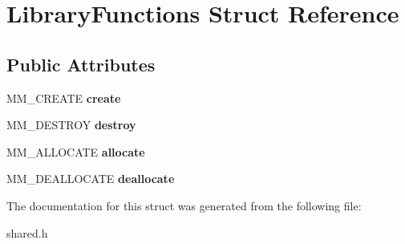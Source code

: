\hypertarget{structLibraryFunctions}{\section{Library\-Functions Struct Reference}
\label{structLibraryFunctions}
}
\subsection*{Public Attributes}
\begin{DoxyCompactItemize}
\item 
\hypertarget{structLibraryFunctions_abd81d32f0b27f2d751ef77f6cbfa3c60}{M\-M\-\_\-\-C\-R\-E\-A\-T\-E {\bfseries create}}\label{structLibraryFunctions_abd81d32f0b27f2d751ef77f6cbfa3c60}

\item 
\hypertarget{structLibraryFunctions_a6e7a32e3a3d654f6c744c8e66b564054}{M\-M\-\_\-\-D\-E\-S\-T\-R\-O\-Y {\bfseries destroy}}\label{structLibraryFunctions_a6e7a32e3a3d654f6c744c8e66b564054}

\item 
\hypertarget{structLibraryFunctions_a1dc4a3d17d034e03a4c3f0355fce3eaa}{M\-M\-\_\-\-A\-L\-L\-O\-C\-A\-T\-E {\bfseries allocate}}\label{structLibraryFunctions_a1dc4a3d17d034e03a4c3f0355fce3eaa}

\item 
\hypertarget{structLibraryFunctions_a3b34102ab26d3bfedf96863f5fa77be5}{M\-M\-\_\-\-D\-E\-A\-L\-L\-O\-C\-A\-T\-E {\bfseries deallocate}}\label{structLibraryFunctions_a3b34102ab26d3bfedf96863f5fa77be5}

\end{DoxyCompactItemize}


The documentation for this struct was generated from the following file\-:\begin{DoxyCompactItemize}
\item 
shared.\-h\end{DoxyCompactItemize}
